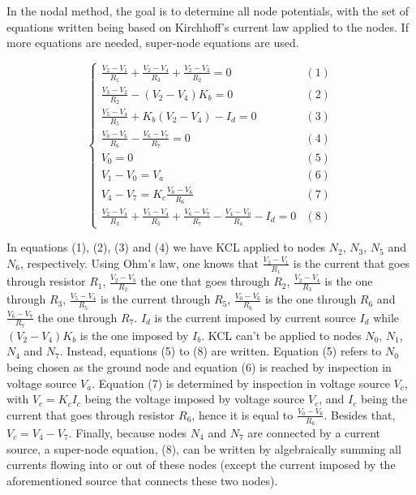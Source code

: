 In the nodal method, the goal is to determine all node potentials, with the set of equations written being based on Kirchhoff's current law applied to the nodes. If more equations are needed, super-node equations are used.

\begin{equation}
  \begin{cases}
    \frac{V_2-V_1}{R_1} + \frac{V_2-V_4}{R_3} + \frac{V_2-V_3}{R_2} = 0 & \mbox{$(1)$} \\
    \frac{V_3-V_2}{R_2} - (V_2-V_4) K_b = 0 & \mbox{$(2)$} \\
    \frac{V_5-V_4}{R_5} + K_b (V_2 - V_4) - I_d = 0 & \mbox{$(3)$}\\
    \frac{V_0-V_6}{R_6} - \frac{V_6-V_7}{R_7} = 0 & \mbox{$(4)$}\\
    V_0 = 0 & \mbox{$(5)$} \\
    V_1-V_0 = V_a & \mbox{$(6)$}  \\
    V_4-V_7 = K_c \frac{V_0-V_6}{R_6} & \mbox{$(7)$} \\
    \frac{V_2-V_4}{R_3} + \frac{V_5-V_4}{R_5} +  \frac{V_6-V_7}{R_7} - \frac{V_4-V_0}{R_4} - I_d = 0 & \mbox{$(8)$}
  \end{cases}
\end{equation}

\par
 In equations (1), (2), (3) and (4) we have KCL applied to nodes $N_2$, $N_3$, $N_5$ and $N_6$, respectively.  Using Ohm's law, one knows that $\frac{V_2 - V_1}{R_1}$ is the current that goes through resistor $R_1$, $\frac{V_2-V_3}{R_2}$ the one that goes through $R_2$, $\frac{V_2-V_4}{R_3}$ is the one through $R_3$, $\frac{V_5-V_4}{R_5}$ is the current through $R_5$, $\frac{V_0-V_6}{R_6}$ is the one through $R_6$ and $\frac{V_6-V_7}{R_7}$ the one through $R_7$. $I_d$ is the current imposed by current source $I_d$ while $(V_2-V_4)K_b$ is the one imposed by $I_b$. KCL can't be applied to nodes $N_0$, $N_1$, $N_4$ and $N_7$. Instead, equations (5) to (8) are written. Equation (5) refers to $N_0$ being chosen as the ground node and equation (6) is reached by inspection in voltage source $V_a$. Equation (7) is determined by inspection in voltage source $V_c$, with $V_c = K_c I_c$ being the voltage imposed by voltage source $V_c$, and $I_c$ being the current that goes through resistor $R_6$, hence it is equal to $\frac{V_0 - V_6}{R_6}$. Besides that, $V_c = V_4-V_7$. Finally, because nodes $N_4$ and $N_7$ are connected by a current source, a super-node equation, (8), can be written by algebraically summing all currents flowing into or out of these nodes (except the current imposed by the aforementioned source that connects these two nodes).



